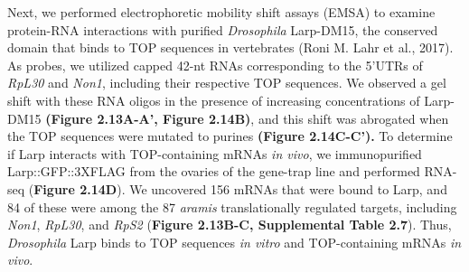 \documentclass[12pt,oneside]{reedthesis}
\begin{document}
Next, we performed electrophoretic mobility shift assays (EMSA) to examine protein-RNA interactions with purified \emph{Drosophila} Larp-DM15, the conserved domain that binds to TOP sequences in vertebrates (Roni M. Lahr et al., 2017). As probes, we utilized capped 42-nt RNAs corresponding to the 5'UTRs of \emph{RpL30} and \emph{Non1}, including their respective TOP sequences. We observed a gel shift with these RNA oligos in the presence of increasing concentrations of Larp-DM15 \textbf{(Figure 2.13A-A', Figure 2.14B)}, and this shift was abrogated when the TOP sequences were mutated to purines \textbf{(Figure 2.14C-C').} To determine if Larp interacts with TOP-containing mRNAs \emph{in vivo}, we immunopurified Larp::GFP::3XFLAG from the ovaries of the gene-trap line and performed RNA-seq (\textbf{Figure 2.14D}). We uncovered 156 mRNAs that were bound to Larp, and 84 of these were among the 87 \emph{aramis} translationally regulated targets, including \emph{Non1}, \emph{RpL30}, and \emph{RpS2} (\textbf{Figure 2.13B-C, Supplemental Table 2.7}). Thus, \emph{Drosophila} Larp binds to TOP sequences \emph{in vitro} and TOP-containing mRNAs \emph{in vivo}.
\end{document}
